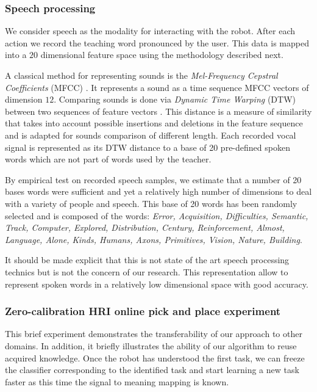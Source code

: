 \documentclass[conference]{IEEEtran}
\begin{document}
\subsubsection{Speech processing}

We consider speech as the modality for interacting with the robot. After each action we record the teaching word pronounced by the user. This data is mapped into a $20$ dimensional feature space using the methodology described next.  

A classical method for representing sounds is the \textit{Mel-Frequency Cepstral Coefficients} (MFCC) \cite{zheng2001comparison}. It represents a sound as a time sequence MFCC vectors of dimension $12$. Comparing sounds is done via \textit{Dynamic Time Warping} (DTW) between two sequences of feature vectors \cite{sakoe1978dynamic}. This distance is a measure of similarity that takes into account possible insertions and deletions in the feature sequence and is adapted for sounds comparison of different length. Each recorded vocal signal is represented as its DTW distance to a base of 20 pre-defined spoken words which are not part of words used by the teacher.

By empirical test on recorded speech samples, we estimate that a number of 20 bases words were sufficient and yet a relatively high number of dimensions to deal with a variety of people and speech. This base of 20 words has been randomly selected and is composed of the words:\emph{ \footnotesize{Error, Acquisition, Difficulties, Semantic, Track, Computer, Explored, Distribution, Century, Reinforcement, Almost, Language, Alone, Kinds, Humans, Axons, Primitives, Vision, Nature, Building}}.

It should be made explicit that this is not state of the art speech processing technics but is not the concern of our research. This representation allow to represent spoken words in a relatively low dimensional space with good accuracy.

\subsubsection{Zero-calibration HRI online pick and place experiment}

This brief experiment demonstrates the transferability of our approach to other domains. In addition, it briefly illustrates the ability of our algorithm to reuse acquired knowledge. Once the robot has understood the first task, we can freeze the classifier corresponding to the identified task and start learning a new task faster as this time the signal to meaning mapping is known.
\end{document}
